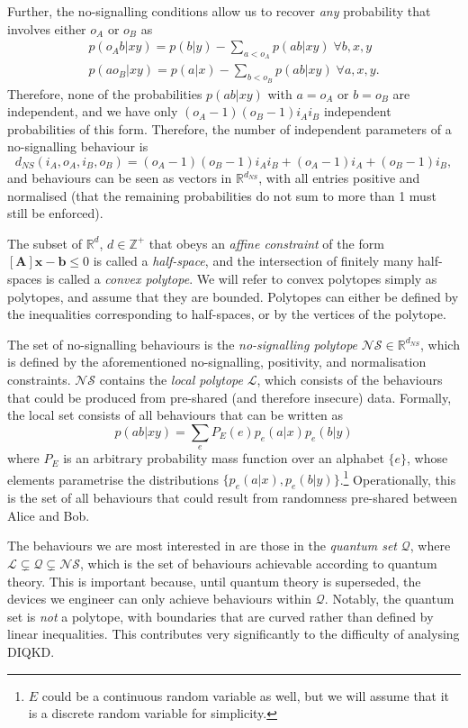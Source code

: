 \documentclass[10pt, a4paper]{article}
\numberwithin{equation}{section} %
\theoremstyle{definition}
\theoremstyle{plain}
\newcommand{\?}{\mathrel{?}} %
\newcommand{\Z}{\mathbb{Z}} %
\newcommand{\R}{\mathbb{R}} %
\newcommand{\cvec}[1]{\boldsymbol{\mathbf{#1}}}    %
\newcommand{\matr}[1]{\left[\mathbf{#1}\right]} %
\newcommand{\Ls}{\mathcal{L}}
\newcommand{\Qs}{\mathcal{Q}}
\newcommand{\NSs}{\mathcal{NS}}
\begin{document}
  Further, the no-signalling conditions allow us to recover \emph{any} probability that involves either \(o_A\) or \(o_B\) as
  \begin{gather*}
    p(o_A b|xy) = p(b|y) - \sum_{a < o_A} p(ab|xy)\;\forall b,x,y \\
    p(ao_B|xy) = p(a|x) - \sum_{b < o_B} p(ab|xy)\;\forall a,x,y.
  \end{gather*}
  Therefore, none of the probabilities \(p(ab|xy)\) with \(a = o_A\) or \(b = o_B\) are independent, and we have only \((o_A-1)(o_B-1){i_A}{i_B}\) independent probabilities of this form. Therefore, the number of independent parameters of a no-signalling behaviour is
  \[ d_{NS}(i_A, o_A, i_B, o_B) = (o_A-1)(o_B-1){i_A}{i_B} + (o_A-1)i_A + (o_B-1)i_B, \]
  and behaviours can be seen as vectors in \(\R^{d_{NS}}\), with all entries positive and normalised (that the remaining probabilities do not sum to more than 1 must still be enforced).

  The subset of \(\R^d\), \(d \in \Z^+\) that obeys an \emph{affine constraint} of the form \(\matr{A}\cvec{x} - \cvec{b} \leq 0\) is called a \emph{half-space}, and the intersection of finitely many half-spaces is called a \emph{convex polytope}. We will refer to convex polytopes simply as polytopes, and assume that they are bounded. Polytopes can either be defined by the inequalities corresponding to half-spaces, or by the vertices of the polytope.

  The set of no-signalling behaviours is the \emph{no-signalling polytope} \(\NSs \in \R^{d_{NS}}\), which is defined by the aforementioned no-signalling, positivity, and normalisation constraints. \(\NSs\) contains the \emph{local polytope} \(\Ls\), which consists of the behaviours that could be produced from pre-shared (and therefore insecure) data. Formally, the local set consists of all behaviours that can be written as 
  \begin{equation}\label{eqn:localdef}
    p(ab|xy) = \sum_e P_E(e) p_{e}(a|x)p_{e}(b|y)
  \end{equation}
  where \(P_E\) is an arbitrary probability mass function over an alphabet \(\{e\}\), whose elements parametrise the distributions \(\{p_e(a|x), p_e(b|y)\}\).\footnote{\(E\) could be a continuous random variable as well, but we will assume that it is a discrete random variable for simplicity.} Operationally, this is the set of all behaviours that could result from randomness pre-shared between Alice and Bob.

  The behaviours we are most interested in are those in the \emph{quantum set} \(\Qs\), where \(\Ls \subsetneq \Qs \subsetneq \NSs\), which is the set of behaviours achievable according to quantum theory. This is important because, until quantum theory is superseded, the devices we engineer can only achieve behaviours within \(\Qs\). Notably, the quantum set is \emph{not} a polytope, with boundaries that are curved rather than defined by linear inequalities. This contributes very significantly to the difficulty of analysing DIQKD.\@
\end{document}
